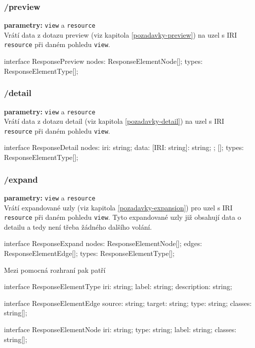 \subsubsection{/preview}
\textbf{parametry:} \texttt{view} a \texttt{resource} \\
Vrátí data z dotazu preview (viz kapitola \ref{pozadavky-preview}) na uzel s IRI \texttt{resource} při daném pohledu \texttt{view}.

\begin{code}
interface ResponsePreview {
    nodes: ResponseElementNode[];
    types: ResponseElementType[];
}
\end{code}

\subsubsection{/detail}
\textbf{parametry:} \texttt{view} a \texttt{resource} \\
Vrátí data z dotazu detail (viz kapitola \ref{pozadavky-detail}) na uzel s IRI \texttt{resource} při daném pohledu \texttt{view}.

\begin{code}
interface ResponseDetail {
    nodes: {
        iri: string;
        data: {
            [IRI: string]: string;
        };
    }[];
    types: ResponseElementType[];
}
\end{code}

\subsubsection{/expand}
\textbf{parametry:} \texttt{view} a \texttt{resource} \\
Vrátí expandované uzly (viz kapitola \ref{pozadavky-expansion}) pro uzel s IRI \texttt{resource} při daném pohledu \texttt{view}. Tyto expandované uzly již obsahují data o detailu a tedy není třeba žádného dalšího volání.

\begin{code}
interface ResponseExpand {
    nodes: ResponseElementNode[];
    edges: ResponseElementEdge[];
    types: ResponseElementType[];
}
\end{code}

\newpage

Mezi pomocná rozhraní pak patří
\begin{code}
interface ResponseElementType {
    iri: string;
    label: string;
    description: string;
}

interface ResponseElementEdge {
    source: string;
    target: string;
    type: string;
    classes: string[];
}

interface ResponseElementNode {
    iri: string;
    type: string;
    label: string;
    classes: string[];
}
\end{code}


